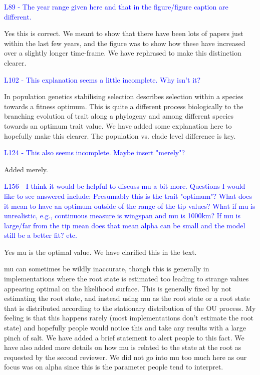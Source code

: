 \documentclass[12pt]{letter}
\begin{document}
\begin{letter}{}
\textcolor{blue}{L89 - The year range given here and that in the figure/figure caption are different.}

Yes this is correct. We meant to show that there have been lots of papers just within the last few years, and the figure was to show how these have increased over a slightly longer time-frame. We have rephrased to make this distinction clearer.

\textcolor{blue}{L102 - This explanation seems a little incomplete. Why isn't it?}

In population genetics stabilising selection describes selection within a species towards a fitness optimum. This is quite a different process biologically to the branching evolution of trait along a phylogeny and among different species towards an optimum trait value. We have added some explanation here to hopefully make this clearer. The population vs. clade level difference is key.

\textcolor{blue}{L124 - This also seems incomplete. Maybe insert "merely"?}

Added merely.

\textcolor{blue}{L156 - I think it would be helpful to discuss mu a bit more. Questions I would like to see answered include: Presumably this is the trait "optimum"? What does it mean to have an optimum outside of the range of the tip values? What if mu is unrealistic, e.g., continuous measure is wingspan and mu is 1000km? If mu is large/far from the tip mean does that mean alpha can be small and the model still be a better fit? etc.}

Yes mu is the optimal value. We have clarified this in the text. 

mu can sometimes be wildly inaccurate, though this is generally in implementations where the root state is estimated too leading to strange values appearing optimal on the likelihood surface. This is generally fixed by not estimating the root state, and instead using mu as the root state or a root state that is distributed according to the stationary distribution of the OU process. My feeling is that this happens rarely (most implementations don't estimate the root state) and hopefully people would notice this and take any results with a large pinch of salt. We have added a brief statement to alert people to this fact. We have also added more details on how mu is related to the state at the root as requested by the second reviewer. We did not go into mu too much here as our focus was on alpha since this is the parameter people tend to interpret.


\end{letter}
\end{document}
